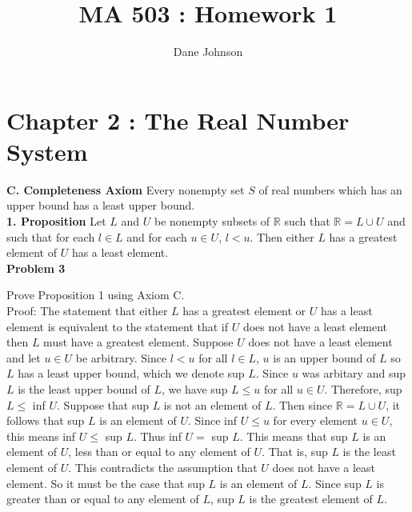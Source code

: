 \documentclass[a4paper]{article}
\title{MA 503 : Homework 1}
\author{Dane Johnson}
\begin{document}
\maketitle

\section*{Chapter 2 : The Real Number System}

{\bf C. Completeness Axiom} Every nonempty set $S$ of real numbers which has an upper bound has a least upper bound.\\

{\bf 1. Proposition} Let $L$ and $U$ be nonempty subsets of $\mathbb{R}$ such that $\mathbb{R} = L \cup U$ and such that for each $l \in L$ and for each $u \in U$, $l<u$. Then either $L$ has a greatest element of $U$ has a least element.\\

{\bf Problem 3}

Prove Proposition 1 using Axiom C.\\

Proof: The statement that either $L$ has a greatest element or $U$ has a least element is equivalent to the statement that if $U$ does not have a least element then $L$ must have a greatest element. Suppose $U$ does not have a least element and let $u \in U$ be arbitrary. Since $l<u$ for all $l \in L$, $u$ is an upper bound of $L$ so $L$ has a least upper bound, which we denote sup $L$. Since $u$ was arbitary and sup $L$ is the least upper bound of $L$, we have sup $L \leq u$ for all $u \in U$. Therefore, sup $L \leq $ inf $U$. Suppose that sup $L$ is not an element of $L$. Then since $\mathbb{R} = L \cup U$, it follows that sup $L$ is an element of $U$. Since inf $U \leq u$ for every element $u \in U$, this means inf $U \leq $ sup $L$. Thus inf $U = $ sup $L$. This means that sup $L$ is an element of $U$, less than or equal to any element of $U$. That is, sup $L$ is the least element of $U$. This contradicts the assumption that $U$ does not have a least element. So it must be the case that sup $L$ is an element of $L$. Since sup $L$ is greater than or equal to any element of $L$, sup $L$ is the greatest element of $L$. \\
\end{document}
